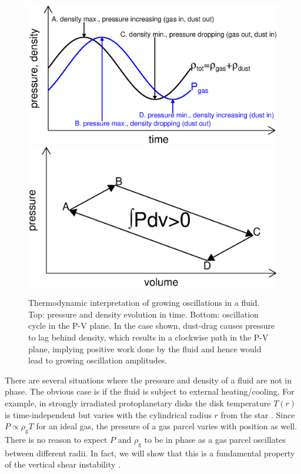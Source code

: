 \documentclass[iop, numberedappendix]{emulateapj}
\newcommand{\rhog}{\rho_\mathrm{g}}
\begin{document}
\begin{figure}
  \includegraphics[width=\linewidth]{figures/drag}\\
\includegraphics[width=\linewidth]{figures/pdv}
  \caption{Thermodynamic interpretation of growing oscillations in a
    fluid. Top: pressure and density evolution in time. 
    Bottom: oscillation cycle in the P-V plane. In the case shown, 
    dust-drag causes 
    pressure to lag behind density, which results in a clockwise path in
    the P-V plane, implying positive work done by the fluid and
    hence would lead to growing oscillation amplitudes.  
    \label{pdv_cartoon}
  }
\end{figure}

There are several situations where the pressure and density of a fluid
are not in phase. The obvious case is if the fluid is subject to
external heating/cooling. For example, in strongly irradiated
protoplanetary disks the
disk temperature  $T(r)$ is time-independent but varies with the cylindrical radius
$r$ from the star \citep{chiang97}. Since $P\propto \rhog T$ for an
ideal gas, the pressure of a gas parcel varies with  
position as well. There is no reason to expect $P$ and $\rhog$ to
be in phase as a gas parcel oscillates between different radii. In
fact, we will show that this is a fundamental property of the vertical
shear instability \citep{lin15}.   
\end{document}
